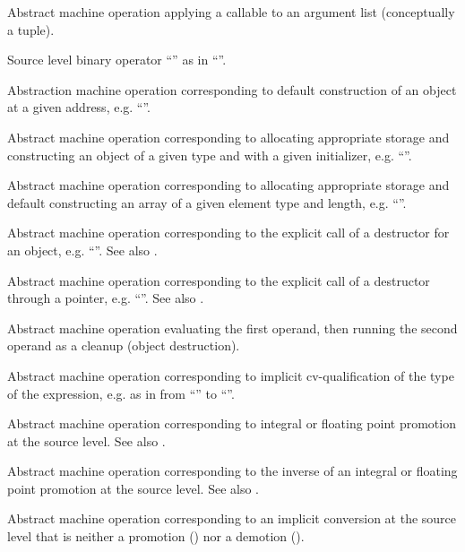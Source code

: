 Abstract machine operation applying a callable to an argument list (conceptually a tuple).

Source level binary operator ``\code{[]}'' as in ``''.

Abstraction machine operation corresponding to default construction of an object at a given address, e.g. ``''.

Abstract machine operation corresponding to allocating appropriate storage and constructing an object of a given type 
and with a given initializer, e.g. ``''.

Abstract machine operation corresponding to allocating appropriate storage and default constructing an array of a given element type and length, 
e.g. ``''. 

Abstract machine operation corresponding to the explicit call of a destructor for an object, e.g. ``''.
See also .

Abstract machine operation corresponding to the explicit call of a destructor through a pointer, e.g. ``''.
See also .

Abstract machine operation evaluating the first operand, then running the second operand as a cleanup (object destruction).

Abstract machine operation corresponding to implicit cv-qualification of the type of the expression, 
e.g. as in from ``'' to ``''.

Abstract machine operation corresponding to integral or floating point promotion at the source level.
See also .

Abstract machine operation corresponding to the inverse of an integral or floating point promotion at the source level.
See also .

Abstract machine operation corresponding to an implicit conversion at the source level that is neither 
a promotion () nor a demotion ().

